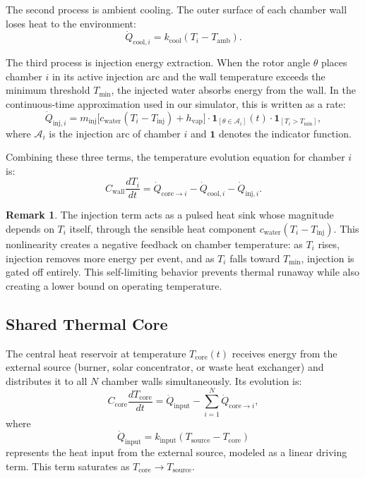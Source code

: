 \documentclass[11pt, a4paper]{article}
\theoremstyle{plain}
\theoremstyle{definition}
\newtheorem{remark}[theorem]{Remark}
\newcommand{\Tcore}{T_{\mathrm{core}}}
\newcommand{\Tsource}{T_{\mathrm{source}}}
\newcommand{\Tambient}{T_{\mathrm{amb}}}
\newcommand{\Tinject}{T_{\mathrm{inj}}}
\newcommand{\Nch}{N}
\begin{document}
The second process is ambient cooling. The outer surface of each chamber wall loses heat to the environment:
\begin{equation}
  \dot{Q}_{\mathrm{cool},i} = k_{\mathrm{cool}} (T_i - \Tambient).
\end{equation}

The third process is injection energy extraction. When the rotor angle $\theta$ places chamber $i$ in its active injection arc and the wall temperature exceeds the minimum threshold $T_{\mathrm{min}}$, the injected water absorbs energy from the wall. In the continuous-time approximation used in our simulator, this is written as a rate:
\begin{equation}
  \dot{Q}_{\mathrm{inj},i} = m_{\mathrm{inj}} \bigl[c_{\mathrm{water}}(T_i - \Tinject) + h_{\mathrm{vap}}\bigr] \cdot \mathbf{1}_{[\theta \in \mathcal{A}_i]}(t) \cdot \mathbf{1}_{[T_i > T_{\mathrm{min}}]},
\end{equation}
where $\mathcal{A}_i$ is the injection arc of chamber $i$ and $\mathbf{1}$ denotes the indicator function.

Combining these three terms, the temperature evolution equation for chamber $i$ is:
\begin{equation}
  C_{\mathrm{wall}} \frac{dT_i}{dt} = \dot{Q}_{\mathrm{core}\to i} - \dot{Q}_{\mathrm{cool},i} - \dot{Q}_{\mathrm{inj},i}.
  \label{eq:chamber_temp}
\end{equation}

\begin{remark}
The injection term acts as a pulsed heat sink whose magnitude depends on $T_i$ itself, through the sensible heat component $c_{\mathrm{water}}(T_i - \Tinject)$. This nonlinearity creates a negative feedback on chamber temperature: as $T_i$ rises, injection removes more energy per event, and as $T_i$ falls toward $T_{\mathrm{min}}$, injection is gated off entirely. This self-limiting behavior prevents thermal runaway while also creating a lower bound on operating temperature.
\end{remark}

\subsection{Shared Thermal Core}

The central heat reservoir at temperature $\Tcore(t)$ receives energy from the external source (burner, solar concentrator, or waste heat exchanger) and distributes it to all $\Nch$ chamber walls simultaneously. Its evolution is:
\begin{equation}
  C_{\mathrm{core}} \frac{d\Tcore}{dt} = \dot{Q}_{\mathrm{input}} - \sum_{i=1}^{\Nch} \dot{Q}_{\mathrm{core}\to i},
  \label{eq:core_temp}
\end{equation}
where
\begin{equation}
  \dot{Q}_{\mathrm{input}} = k_{\mathrm{input}}(\Tsource - \Tcore)
\end{equation}
represents the heat input from the external source, modeled as a linear driving term. This term saturates as $\Tcore \to \Tsource$.
\end{document}
